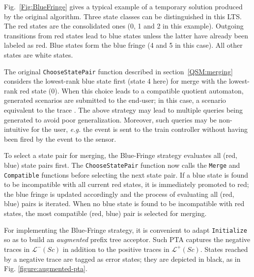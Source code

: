Fig.~\ref{Fig:BlueFringe} gives a typical example of a temporary solution produced by the original algorithm. Three state classes can be distinguished in this LTS. The red states are the consolidated ones (0, 1 and 2 in this example). Outgoing transitions from red states lead to blue states unless the latter have already been labeled as red. Blue states form the blue fringe (4 and 5 in this case). All other states are white states. 

The original \texttt{ChooseStatePair} function described in section~\ref{QSM:merging} considers the lowest-rank blue state first (state 4 here) for merge with the lowest-rank red state (0). When this choice leads to a compatible quotient automaton, generated scenarios are submitted to the end-user; in this case, a scenario equivalent to the trace . The above strategy may lead to multiple queries being generated to avoid poor generalization. Moreover, such queries may be non-intuitive for the user, \textit{e.g.} the  event is sent to the train controller without having been fired by the  event to the sensor.

To select a state pair for merging, the Blue-Fringe strategy evaluates all (red, blue) state pairs first. The \texttt{ChooseStatePair} function now calls the \texttt{Merge} and \texttt{Compatible} functions before selecting the next state pair. If a blue state is found to be incompatible with all current red states, it is immediately promoted to red; the blue fringe is updated accordingly and the process of evaluating all (red, blue) pairs is iterated. When no blue state is found to be incompatible with red states, the most compatible (red, blue) pair is selected for merging. 

For implementing the Blue-Fringe strategy, it is convenient to adapt \texttt{Initialize} so as to build an \emph{augmented} prefix tree acceptor. Such PTA captures the negative traces in $\mathcal{L}^-(Sc)$ in addition to the positive traces in $\mathcal{L}^+(Sc)$. States reached by a negative trace are tagged as error states; they are depicted in black, as in Fig. \ref{figure:augmented-pta}. 

